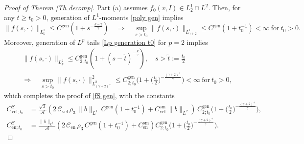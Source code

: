 \documentclass[11pt,a4paper]{amsart}
\newcommand{\g}{\gamma}
\newcommand{\Ls}{L^1}
\newcommand{\mA}{\mathcal{A}}
\newcommand{\Csvel}{C_{\text{vel}}^{\text{sm}}}
\newcommand{\Csen}{C_{\text{en}}^{\text{sm}}}
\newcommand{\CveltS}{C_{\text{vel};t_0}^{S}}
\newcommand{\CenttS}{C_{\text{en};t_0}^{S}}
\newcommand{\Clvel}{\mathcal{C}_{\text{vel}}}
\newcommand{\Clen}{\mathcal{C}_{\text{en}}}
\begin{document}
\begin{proof}[Proof of Therem \ref{Th decomp}]
Part (a) assumes $f_0(v,I) \in L^1_2 \cap L^2$. Then, for any $t\geq t_0 >0$,  generation of $L^1$-moments \eqref{poly gen} implies
\begin{equation}\label{poly gen 2}
	\| f(s,\cdot) \|_{L^1_k} \leq C^{\text{gen}} \left(1  +  s^{-\frac{k-2}{\g}} \right) \quad \Rightarrow \quad  \sup_{s>t_0}  \|  	{f}(s,\cdot)    \|_{L^1_{\g+2}} \leq  C^{\text{gen}}  \left(1  +  t_0^{-1} \right) < \infty \ \text{for} \ t_0>0.
\end{equation}
Moreover, generation of $L^p$ tails \eqref{Lp generation t0} for $p=2$ implies
\begin{multline*}
	 \| f(s,\cdot)\|_{L^2_{k}} \leq C^{\text{gen}}_{2; t_0}  (1+ (s-\tilde{t})^{-\frac{k}{\g}}), \quad s>\tilde{t} := \frac{t_0}{2} \\ \Rightarrow \quad \sup_{s> t_0} \| f(s,\cdot)\|^2_{L^2_{(\g+2)^+}} \leq C^{\text{gen}}_{2; t_0}  \Big(1+ \Big(\frac{t_0}{2}\Big)^{-\frac{(\g+2)^+}{\g}}\Big) < \infty \ \text{for} \ t_0>0,
\end{multline*}
which completes the proof of \eqref{fS gen}, with the constants
\begin{equation*}
	\begin{split}
\CveltS & = \frac{\sqrt{3}}{\mA} \left( 2  \, \Clvel  \,  \rho_3 \,  	\| b \|_{\Ls}\,C^{\text{gen}}  \left(1  +  t_0^{-1} \right) +   \Csvel \, \|b\|_{L^{2}} \right)\,C^{\text{gen}}_{2; t_0}  \Big(1+ \Big(\frac{t_0}{2}\Big)^{-\frac{(\g+2)^+}{\g}}\Big), \\
	\CenttS & = \frac{	\| b \|_{\Ls} }{\mA}  \left(    2 \, \Clen \, \rho_3 \,      C^{\text{gen}}  \left(1  +  t_0^{-1} \right)  +   \Csen \right) C^{\text{gen}}_{2; t_0}  \Big(1+ \Big(\frac{t_0}{2}\Big)^{-\frac{(\g+2)^+}{\g}}\Big).
	\end{split}
\end{equation*}


\end{proof}
\end{document}
